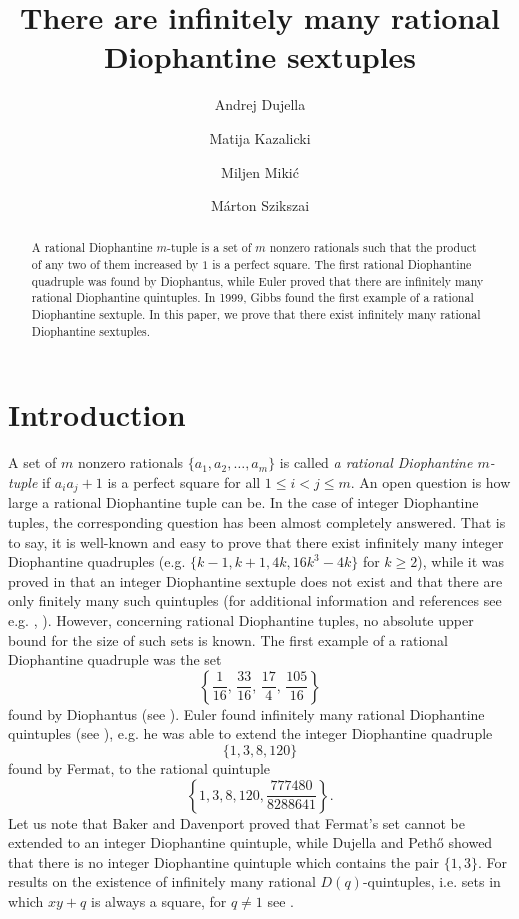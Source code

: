 \documentclass[11pt]{amsart}
\title{There are infinitely many rational Diophantine sextuples}
\author{Andrej Dujella}
\author{Matija Kazalicki}
\author{Miljen Miki\'c}
\author{M\'arton Szikszai}
\theoremstyle{plain}
\theoremstyle{remark}
\begin{document}
\begin{abstract}
A rational Diophantine $m$-tuple is a set of $m$ nonzero rationals such that the product of any two of them increased by $1$ is a perfect square. The first rational Diophantine quadruple was found by Diophantus, while Euler proved that there are infinitely many rational Diophantine quintuples. In 1999, Gibbs found the first example of a rational Diophantine sextuple. In this paper, we prove that there exist infinitely many rational Diophantine sextuples.
\end{abstract}

\maketitle

\section{Introduction}

\noindent A set of $m$ nonzero rationals $\{a_1,a_2,\ldots,a_m\}$ is called {\em a rational Diophantine $m$-tuple} if $a_ia_j+1$ is a perfect square for all $1\leq i<j\leq m$. An open question is how large a rational Diophantine tuple can be. In the case of integer Diophantine tuples, the corresponding question has been almost completely answered. That is to say, it is well-known and easy to prove that there exist infinitely many integer Diophantine quadruples (e.g. $\{k-1,k+1,4k,16k^3-4k\}$ for $k\geq 2$), while it was proved in \cite{D-crelle} that an integer Diophantine sextuple does not exist and that there are only finitely many such quintuples (for additional information and references see e.g. \cite{D-web}, \cite[Section D29]{Guy}). However, concerning rational Diophantine tuples, no absolute upper bound for the size of such sets is known. The first example of a rational Diophantine quadruple was the set
$$
\left\{\frac{1}{16},\, \frac{33}{16},\, \frac{17}{4},\, \frac{105}{16}\right\}
$$
found by Diophantus (see \cite{Dio}). Euler found infinitely many rational Diophantine quintuples (see \cite{Hea}),  e.g. he was able to extend the integer Diophantine quadruple
$$
\{1,3,8,120\}
$$
found by Fermat, to the rational quintuple
$$
\left\{ 1, 3, 8, 120, \frac{777480}{8288641} \right\}.
$$
Let us note that Baker and Davenport \cite{B-D} proved that Fermat's set cannot be extended to an integer Diophantine quintuple, while Dujella and Peth\H{o} \cite{Du-Pe} showed that there is no integer Diophantine quintuple which contains the pair $\{1,3\}$.
For results on the existence of infinitely many rational $D(q)$-quintuples,
 i.e. sets in which $xy+q$ is always a square, for $q\neq 1$ see \cite{D-F}.
\end{document}
